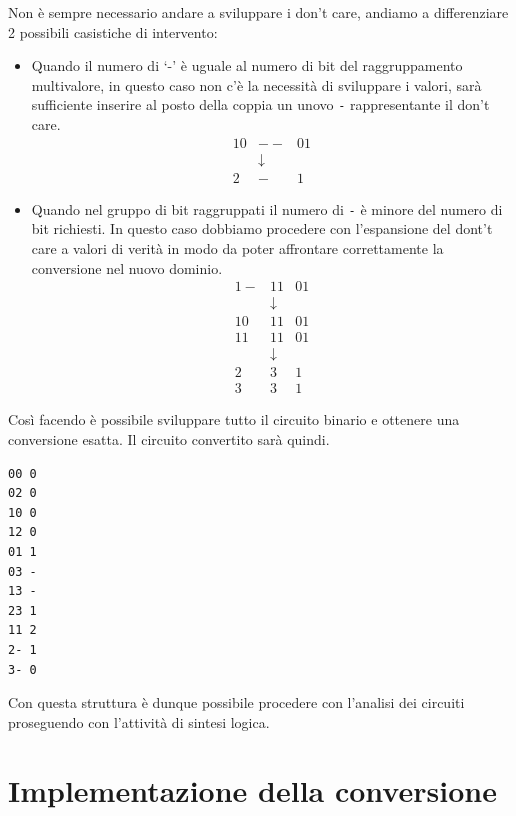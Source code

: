 \documentclass[
  italian,
]{book}
\providecommand{\tightlist}{%
  \setlength{\itemsep}{0pt}\setlength{\parskip}{0pt}}
\begin{document}
\newpage

Non è sempre necessario andare a sviluppare i don't care, andiamo a differenziare 2 possibili casistiche di intervento:

\begin{itemize}
\tightlist
\item
  Quando il numero di `-' è uguale al numero di bit del raggruppamento multivalore, in questo caso non c'è la necessità di sviluppare i valori, sarà sufficiente inserire al posto della coppia un unovo \texttt{-} rappresentante il don't care.
  \[ \begin{array}{ccc}
        10 & -- & 01 \\ & \downarrow & \\ 2 & - & 1 
    \end{array}\]
\item
  Quando nel gruppo di bit raggruppati il numero di \texttt{-} è minore del numero di bit richiesti. In questo caso dobbiamo procedere con l'espansione del dont't care a valori di verità in modo da poter affrontare correttamente la conversione nel nuovo dominio.
  \[ \begin{array}{cccc}
            1- & 11 & 01\\
            & \downarrow &\\
            10 & 11 & 01\\
            11 & 11 & 01\\
            & \downarrow &\\
            2 & 3 & 1\\
            3 & 3 & 1
        \end{array}\]
\end{itemize}

\newpage

Così facendo è possibile sviluppare tutto il circuito binario e ottenere una conversione esatta. Il circuito convertito
sarà quindi.

\begin{verbatim}
00 0
02 0
10 0
12 0
01 1
03 -
13 -
23 1
11 2
2- 1
3- 0
\end{verbatim}

Con questa struttura è dunque possibile procedere con l'analisi dei circuiti proseguendo con l'attività di sintesi logica.

\hypertarget{implementazione-della-conversione}{%
\section{Implementazione della conversione}\label{implementazione-della-conversione}}
\end{document}
